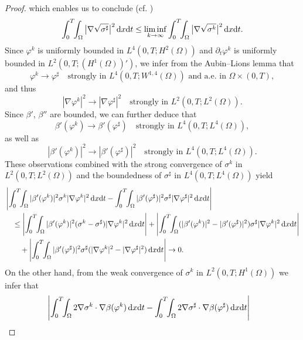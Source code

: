 \documentclass[11pt,reqno]{amsart}
\def\d{{\rm d}}
\begin{document}
\begin{proof}
%
which enables us to conclude (cf. \cite[Proof of Lemma 4.1]{W2016})
\begin{align}
\int_0^T \!\! \int_\Omega  \big|\nabla \sqrt{\sigma^{\sharp}} \big|^2  \, \d x \d t
\leq \liminf_{k \to \infty}
\int_0^T \!\! \int_\Omega \big|\nabla \sqrt{\sigma^{k}} \big|^2 \, \d x \d t.
\label{Dis-Sig-1}
\end{align}
Since $\varphi^k$ is uniformly bounded in $L^4(0,T; H^2(\Omega))$ and $\partial_t\varphi^k$ is uniformly bounded in $L^2(0,T; (H^1(\Omega))')$, we infer from the Aubin--Lions lemma that
$$
\varphi^k \to \varphi^{\sharp} \quad \text{strongly in } L^4(0,T; W^{1,4}(\Omega))\text{ and  a.e. in } \Omega \times (0,T),
$$
and thus
$$
|\nabla \varphi^k|^2 \to |\nabla \varphi^{\sharp}|^2 \quad \text{strongly in } L^2(0,T; L^2(\Omega)).
$$
Since $\beta'$, $\beta''$ are bounded, we can further deduce that
$$
\beta'(\varphi^k) \rightarrow \beta'(\varphi^{\sharp}) \quad \text{strongly in } L^4(0,T; L^4(\Omega)),
$$
as well as
$$
|\beta'( \varphi^k)|^2 \to |\beta'( \varphi^{\sharp})|^2 \quad \text{strongly in } L^4(0,T; L^4(\Omega)).
$$
%
These observations combined with the strong convergence of $\sigma^k$ in $L^2(0,T; L^2(\Omega))$ and the boundedness of $\sigma^{\sharp}$ in $L^4(0,T;L^4(\Omega))$ yield
%
\begin{align}
&\left|\int_0^T\!\! \int_\Omega |\beta'(\varphi^k)|^2 \sigma^k |\nabla \varphi^k|^2 \, \d x \d t
- \int_0^T \!\! \int_\Omega |\beta'(\varphi^{\sharp})|^2 \sigma^{\sharp} |\nabla \varphi^{\sharp}|^2 \, \d x\d t\right|
 \notag \\
&\quad \leq \left|\int_0^T\!\! \int_\Omega |\beta'(\varphi^k)|^2 (\sigma^k-\sigma^{\sharp} )  |\nabla \varphi^k|^2 \, \d x \d t \right|
+
\left|\int_0^T\!\! \int_\Omega (|\beta'(\varphi^k)|^2 - |\beta'(\varphi^{\sharp})|^2) \sigma^{\sharp} |\nabla \varphi^k|^2 \, \d x \d t\right|
\notag \\
&\qquad
+ \left| \int_0^T \!\! \int_\Omega |\beta'(\varphi^{\sharp})|^2 \sigma^{\sharp} (|\nabla \varphi^k|^2-|\nabla \varphi^{\sharp}|^2) \, \d x\d t\right|
\to 0.
\label{Dis-Sig-2}
\end{align}
%
On the other hand, from the weak convergence of $\sigma^k$ in $L^2(0,T; H^1(\Omega))$ we infer that
%
\begin{align}
&\left|\int_0^T\!\! \int_{\Omega} 2 \nabla \sigma^k \cdot \nabla \beta(\varphi^k) \, \d x\d t- \int_0^T\!\! \int_{\Omega} 2 \nabla \sigma^{\sharp} \cdot \nabla \beta(\varphi^{\sharp}) \, \d x\d t\right|

\end{align}
\end{proof}
\end{document}
